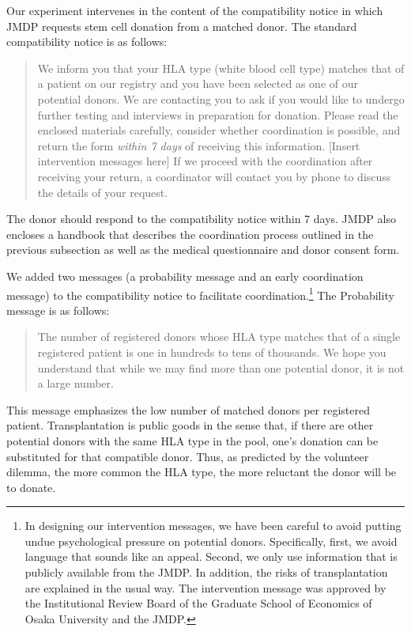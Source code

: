 \documentclass[
  11pt,
  a4paper
]{article}
\begin{document}
Our experiment intervenes in the content of the compatibility notice in which JMDP requests stem cell donation from a matched donor. The standard compatibility notice is as follows:

\begin{quote}
We inform you that your HLA type (white blood cell type) matches that of a patient on our registry and you have been selected as one of our potential donors. We are contacting you to ask if you would like to undergo further testing and interviews in preparation for donation. Please read the enclosed materials carefully, consider whether coordination is possible, and return the form \emph{within 7 days} of receiving this information. {[}Insert intervention messages here{]} If we proceed with the coordination after receiving your return, a coordinator will contact you by phone to discuss the details of your request.
\end{quote}

The donor should respond to the compatibility notice within 7 days. JMDP also encloses a handbook that describes the coordination process outlined in the previous subsection as well as the medical questionnaire and donor consent form.

We added two messages (a probability message and an early coordination message) to the compatibility notice to facilitate coordination.\footnote{In designing our intervention messages, we have been careful to avoid putting undue psychological pressure on potential donors. Specifically, first, we avoid language that sounds like an appeal. Second, we only use information that is publicly available from the JMDP. In addition, the risks of transplantation are explained in the usual way. The intervention message was approved by the Institutional Review Board of the Graduate School of Economics of Osaka University and the JMDP.} The Probability message is as follows:

\begin{quote}
The number of registered donors whose HLA type matches that of a single registered patient is one in hundreds to tens of thousands. We hope you understand that while we may find more than one potential donor, it is not a large number.
\end{quote}

This message emphasizes the low number of matched donors per registered patient. Transplantation is public goods in the sense that, if there are other potential donors with the same HLA type in the pool, one's donation can be substituted for that compatible donor. Thus, as predicted by the volunteer dilemma, the more common the HLA type, the more reluctant the donor will be to donate.
\end{document}
